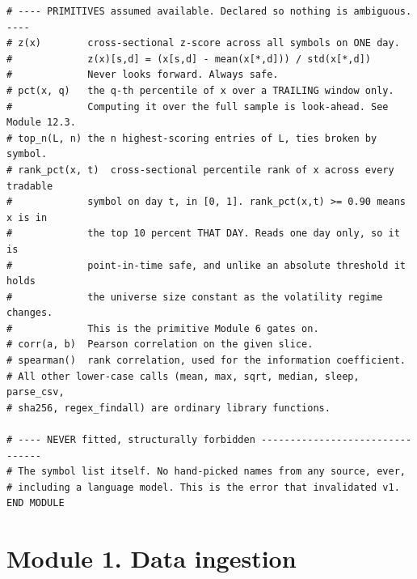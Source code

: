 \documentclass[10pt]{article}
\begin{document}
\begin{lstlisting}
# ---- PRIMITIVES assumed available. Declared so nothing is ambiguous. ----
# z(x)        cross-sectional z-score across all symbols on ONE day.
#             z(x)[s,d] = (x[s,d] - mean(x[*,d])) / std(x[*,d])
#             Never looks forward. Always safe.
# pct(x, q)   the q-th percentile of x over a TRAILING window only.
#             Computing it over the full sample is look-ahead. See Module 12.3.
# top_n(L, n) the n highest-scoring entries of L, ties broken by symbol.
# rank_pct(x, t)  cross-sectional percentile rank of x across every tradable
#             symbol on day t, in [0, 1]. rank_pct(x,t) >= 0.90 means x is in
#             the top 10 percent THAT DAY. Reads one day only, so it is
#             point-in-time safe, and unlike an absolute threshold it holds
#             the universe size constant as the volatility regime changes.
#             This is the primitive Module 6 gates on.
# corr(a, b)  Pearson correlation on the given slice.
# spearman()  rank correlation, used for the information coefficient.
# All other lower-case calls (mean, max, sqrt, median, sleep, parse_csv,
# sha256, regex_findall) are ordinary library functions.

# ---- NEVER fitted, structurally forbidden --------------------------------
# The symbol list itself. No hand-picked names from any source, ever,
# including a language model. This is the error that invalidated v1.
END MODULE
\end{lstlisting}

\section{Module 1. Data ingestion}
\end{document}
